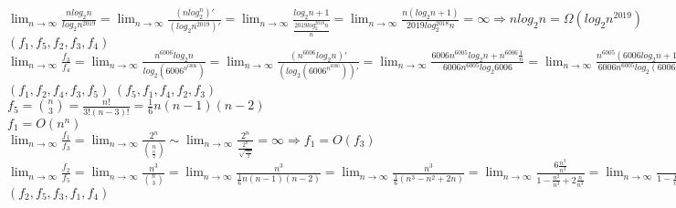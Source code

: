 \documentclass[12pt,twoside]{article}
\begin{document}


\begin{problems}

\problem  %

\begin{problemparts}
\problempart %
$\displaystyle{\lim_{n \to \infty}}\frac{n log_2n}{log_2n^{2019}}=\displaystyle{\lim_{n \to \infty}}\frac{(n log_2^{n})'}{(log_2n^{2019})'}=\displaystyle{\lim_{n \to \infty}}\frac{log_2n+1}{\frac{2019 log_2^{2018}n}{n}}=\displaystyle{\lim_{n \to \infty}}\frac{n(log_2n + 1)}{2019 log_2^{2018}n}=\infty \Rightarrow n log_2n =\Omega(log_2n^{2019}) $ \\ [1em]
$(f_1, f_5, f_2, f_3, f_4)$
\problempart %
$\displaystyle{\lim_{n \to \infty}}\frac{f_3}{f_4}=\displaystyle{\lim_{n \to \infty}}\frac{n^{6006}log_2n}{log_2(6006^{n^{6006}})}=\displaystyle{\lim_{n \to \infty}}\frac{(n^{6006}log_2n)'}{(log_2(6006^{n^{6006}}))'}=\displaystyle{\lim_{n \to \infty}}\frac{6006n^{6005}log_2n+n^{6006}\frac{1}{n}}{6006n^{6005}log_2 6006}=\displaystyle{\lim_{n \to \infty}}\frac{n^{6005}(6006 log_2n + 1)}{6006n^{6005} log_2(6006)}=\displaystyle{\lim_{n \to \infty}}\frac{6006log_2n+1}{6006 log_2(6006)} = \infty \Rightarrow n^{6006}log_2n = \Omega(log_2(6006^{n^{6006}}) $ \\ [1em]
$({f_1, f_2}, f_4, f_3, f_5)$
\problempart %
$(f_5, f_1, f_4, f_2, f_3)$
\problempart %
$f_5=\binom{n}{3}=\frac{n!}{3! (n-3)!}=\frac{1}{6}n(n-1)(n-2)$ \\
$f_1=O(n^{n})$ \\
$\displaystyle{\lim_{n \to \infty}}\frac{f_1}{f_3}=\displaystyle{\lim_{n \to \infty}}\frac{2^{n}}{\binom{n}{\frac{n}{2}}}\sim \displaystyle{\lim_{n \to \infty}}\frac{2^{n}}{\frac{2^{n}}{\sqrt{\frac{\pi n}{2}}}}=\infty \Rightarrow f_1=O(f_3)$ \\
$\displaystyle{\lim_{n \to \infty}}\frac{f_2}{f_5}=\displaystyle{\lim_{n \to \infty}}\frac{n^{3}}{\binom{n}{3}}=\displaystyle{\lim_{n \to \infty}}\frac{n^{3}}{\frac{1}{6}n(n-1)(n-2)}=\displaystyle{\lim_{n \to \infty}}\frac{n^{3}}{\frac{1}{6}(n^{3}-n^{2}+2n)}=\displaystyle{\lim_{n \to \infty}}\frac{6\frac{n^{3}}{n^{3}}}{1-\frac{n^{2}}{n^{3}}+2\frac{n}{n^{3}}}=\displaystyle{\lim_{n \to \infty}}\frac{6}{1-\frac{1}{n}+2\frac{1}{n^{2}}}=6 \Rightarrow f_2=\Theta(f_5)$ \\ [1em]
$({f_2, f_5}, f_3, f_1, f_4)$
\end{problemparts}


\end{problems}
\end{document}
